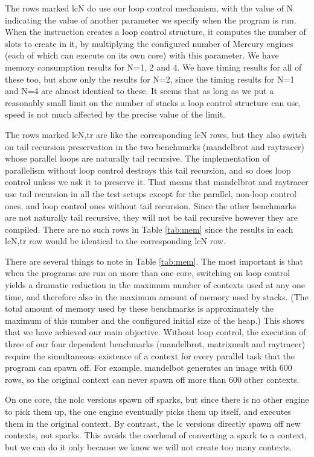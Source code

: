 The rows marked lcN do use our loop control mechanism,
with the value of N indicating
the value of another parameter we specify when the program is run.
When the  instruction
creates a loop control structure,
it computes the number of slots to create in it,
by multiplying the configured number of Mercury engines
(each of which can execute on its own core)
with this parameter.
We have memory consumption results for N=1, 2 and 4.
We have timing results for all of these too,
but show only the results for N=2,
since the timing results for N=1 and N=4 are almost identical to these.
It seems that as long as we put a reasonably small limit
on the number of stacks a loop control structure can use,
speed is not much affected by the precise value of the limit.

The rows marked lcN,tr are like the corresponding lcN rows,
but they also switch on tail recursion preservation
in the two benchmarks (mandelbrot and raytracer)
whose parallel loops are naturally tail recursive.
The implementation of parallelism without loop control
destroys this tail recursion,
and so does loop control unless we ask it to preserve it.
That means that mandelbrot and raytracer use tail recursion
in all the test setups except for
the parallel, non-loop control ones,
and loop control ones without tail recursion.
Since the other benchmarks are not naturally tail recursive,
they will not be tail recursive however they are compiled.
There are no such rows in Table \ref{tab:mem}
since the results in each lcN,tr row
would be identical to the corresponding lcN row.

There are several things to note in Table \ref{tab:mem}.
The most important is that when the programs are run on more than one core,
switching on loop control yields a dramatic reduction
in the maximum number of contexts used at any one time,
and therefore also in the maximum amount of memory used by stacks.
(The total amount of memory used by these benchmarks
is approximately the maximum of this number
and the configured initial size of the heap.)
This shows that we have achieved our main objective.
Without loop control, the execution of
three of our four dependent benchmarks (mandelbrot, matrixmult and raytracer)
require the simultaneous existence of a context
for every parallel task that the program can spawn off.
For example, mandelbot generates an image with 600 rows,
so the original context can never spawn off more than 600 other contexts.

On one core, the nolc versions spawn off sparks,
but since there is no other engine to pick them up,
the one engine eventually picks them up itself,
and executes them in the original context.
By contrast, the lc versions directly spawn off new contexts, not sparks.
This avoids the overhead of converting a spark to a context,
but we can do it only because we know we will not create too many contexts.

